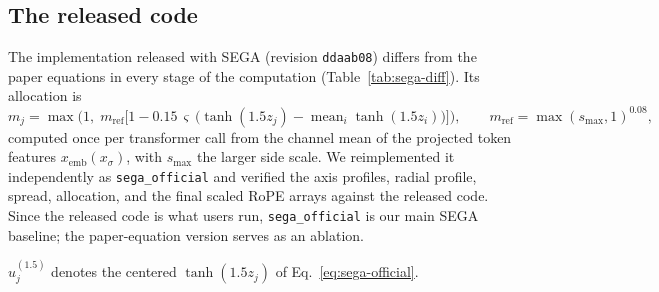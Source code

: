 \subsection{The released code}
\label{sec:sega-code}
The implementation released with SEGA (revision \texttt{ddaab08}) differs from the paper equations in every stage of the computation (Table~\ref{tab:sega-diff}). Its allocation is
\begin{equation}
m_j = \max\!\Big(1,\; m_{\mathrm{ref}}\big[1 - 0.15\,\varsigma\,\big(\tanh(1.5 z_j) - \operatorname{mean}_i \tanh(1.5 z_i)\big)\big]\Big),
\qquad m_{\mathrm{ref}} = \max(s_{\max},1)^{0.08},
\label{eq:sega-official}
\end{equation}
computed once per transformer call from the channel mean of the projected token features $x_{\mathrm{emb}}(x_\sigma)$, with $s_{\max}$ the larger side scale. We reimplemented it independently as \texttt{sega\_official} and verified the axis profiles, radial profile, spread, allocation, and the final scaled RoPE arrays against the released code. Since the released code is what users run, \texttt{sega\_official} is our main SEGA baseline; the paper-equation version serves as an ablation.

\begin{table}[t]
\centering
\small
\caption{SEGA as written in the paper and as released. Both use NTK2-type frequencies and a flatness spread with exponent 1.5.}
\label{tab:sega-diff}

\smallskip
{\footnotesize $u_j^{(1.5)}$ denotes the centered $\tanh(1.5z_j)$ of Eq.~\eqref{eq:sega-official}.}
\end{table}


